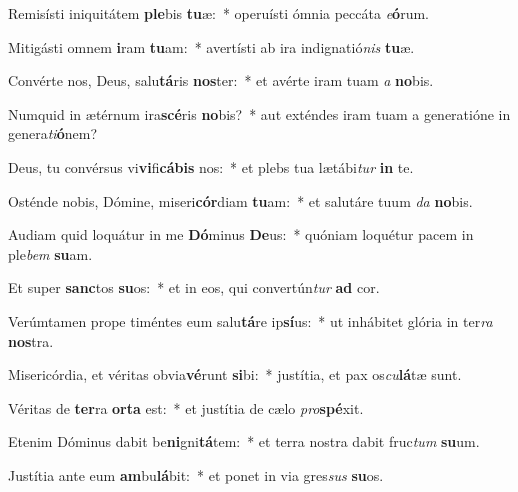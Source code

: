 \item Remisísti iniquitátem \textbf{ple}bis \textbf{tu}æ:~* operuísti ómnia peccáta \textit{e}\textbf{ó}rum.
\item Mitigásti omnem \textbf{i}ram \textbf{tu}am:~* avertísti ab ira indignatió\textit{nis} \textbf{tu}æ.
\item Convérte nos, Deus, salu\textbf{tá}ris \textbf{nos}ter:~* et avérte iram tuam \textit{a} \textbf{no}bis.
\item Numquid in ætérnum ira\textbf{scé}ris \textbf{no}bis?~* aut exténdes iram tuam a generatióne in genera\textit{ti}\textbf{ó}nem?
\item Deus, tu convérsus vi\textbf{vi}fi\textbf{cá}\textbf{bis} nos:~* et plebs tua lætábi\textit{tur} \textbf{in} te.
\item Osténde nobis, Dómine, miseri\textbf{cór}diam \textbf{tu}am:~* et salutáre tuum \textit{da} \textbf{no}bis.
\item Audiam quid loquátur in me \textbf{Dó}minus \textbf{De}us:~* quóniam loquétur pacem in ple\textit{bem} \textbf{su}am.
\item Et super \textbf{sanc}tos \textbf{su}os:~* et in eos, qui convertún\textit{tur} \textbf{ad} cor.
\item Verúmtamen prope timéntes eum salu\textbf{tá}re ip\textbf{sí}us:~* ut inhábitet glória in ter\textit{ra} \textbf{nos}tra.
\item Misericórdia, et véritas obvia\textbf{vé}runt \textbf{si}bi:~* justítia, et pax os\textit{cu}\textbf{lá}tæ sunt.
\item Véritas de \textbf{ter}ra \textbf{or}\textbf{ta} est:~* et justítia de cælo \textit{pro}\textbf{spé}xit.
\item Etenim Dóminus dabit be\textbf{ni}gni\textbf{tá}tem:~* et terra nostra dabit fruc\textit{tum} \textbf{su}um.
\item Justítia ante eum \textbf{am}bu\textbf{lá}bit:~* et ponet in via gres\textit{sus} \textbf{su}os.
